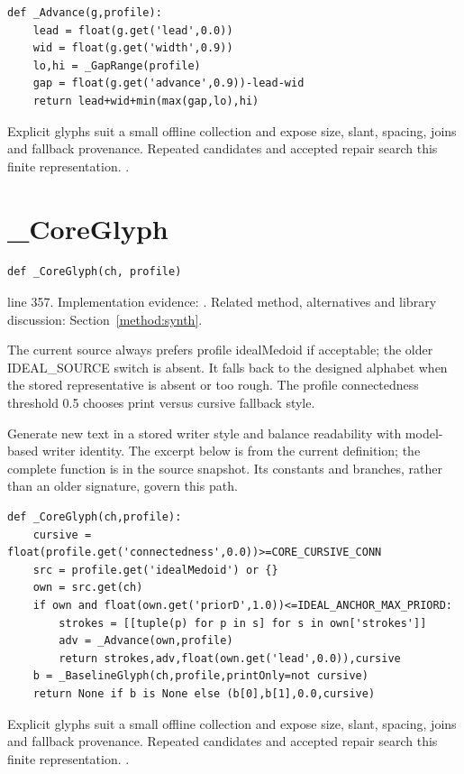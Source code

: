 \begin{lstlisting}[style=plain]
def _Advance(g,profile):
    lead = float(g.get('lead',0.0))
    wid = float(g.get('width',0.9))
    lo,hi = _GapRange(profile)
    gap = float(g.get('advance',0.9))-lead-wid
    return lead+wid+min(max(gap,lo),hi)
\end{lstlisting}
Explicit glyphs suit a small offline collection and expose size, slant, spacing, joins and fallback provenance. Repeated candidates and accepted repair search this finite representation. \cite{haines2016,gravesgenerate,ganwriting,onedm}.


\section{\_CoreGlyph}\label{fn:synthesise:-CoreGlyph}
\begin{lstlisting}[style=sig]
def _CoreGlyph(ch, profile)
\end{lstlisting}
 line 357. Implementation evidence: \cite{code2026}. Related method, alternatives and library discussion: Section~\ref{method:synth}.


The current source always prefers profile idealMedoid if acceptable; the older IDEAL\_SOURCE switch is absent. It falls back to the designed alphabet when the stored representative is absent or too rough. The profile connectedness threshold 0.5 chooses print versus cursive fallback style.


Generate new text in a stored writer style and balance readability with model-based writer identity. The excerpt below is from the current definition; the complete function is in the source snapshot. Its constants and branches, rather than an older signature, govern this path.


\begin{lstlisting}[style=plain]
def _CoreGlyph(ch,profile):
    cursive = float(profile.get('connectedness',0.0))>=CORE_CURSIVE_CONN
    src = profile.get('idealMedoid') or {}
    own = src.get(ch)
    if own and float(own.get('priorD',1.0))<=IDEAL_ANCHOR_MAX_PRIORD:
        strokes = [[tuple(p) for p in s] for s in own['strokes']]
        adv = _Advance(own,profile)
        return strokes,adv,float(own.get('lead',0.0)),cursive
    b = _BaselineGlyph(ch,profile,printOnly=not cursive)
    return None if b is None else (b[0],b[1],0.0,cursive)
\end{lstlisting}
Explicit glyphs suit a small offline collection and expose size, slant, spacing, joins and fallback provenance. Repeated candidates and accepted repair search this finite representation. \cite{haines2016,gravesgenerate,ganwriting,onedm}.


